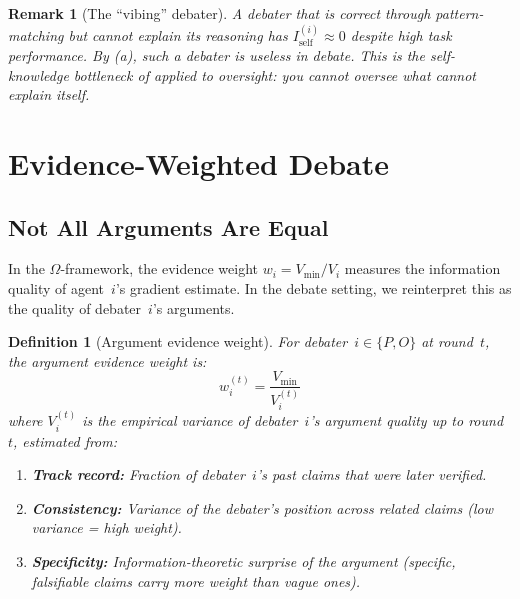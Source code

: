 \documentclass[11pt,a4paper]{article}
\newtheorem{definition}[theorem]{Definition}
\newtheorem{remark}[theorem]{Remark}
\begin{document}
\begin{remark}[The ``vibing'' debater]
A debater that is correct through pattern-matching but cannot explain its
reasoning has $I_{\text{self}}^{(i)} \approx 0$ despite high task
performance. By (a), such a debater is useless
in debate. This is the self-knowledge bottleneck of
\cite{shcherbinin2026coop} applied to oversight: \emph{you cannot oversee
what cannot explain itself.}
\end{remark}


\section{Evidence-Weighted Debate}
\label{sec:ew-debate}

\subsection{Not All Arguments Are Equal}

In the $\Omega$-framework, the evidence weight $w_i = V_{\min}/V_i$
measures the information quality of agent~$i$'s gradient estimate.
In the debate setting, we reinterpret this as the quality of
debater~$i$'s arguments.

\begin{definition}[Argument evidence weight]
\label{def:arg-weight}
For debater~$i \in \{P, O\}$ at round~$t$, the argument evidence weight is:
\begin{equation}
    w_i^{(t)} = \frac{V_{\min}}{V_i^{(t)}}
\end{equation}
where $V_i^{(t)}$ is the empirical variance of debater~$i$'s argument
quality up to round~$t$, estimated from:
\begin{enumerate}[\rm(i)]
    \item \textbf{Track record:} Fraction of debater~$i$'s past claims
    that were later verified.
    \item \textbf{Consistency:} Variance of the debater's position across
    related claims (low variance = high weight).
    \item \textbf{Specificity:} Information-theoretic surprise of the
    argument (specific, falsifiable claims carry more weight than vague ones).
\end{enumerate}
\end{definition}
\end{document}
